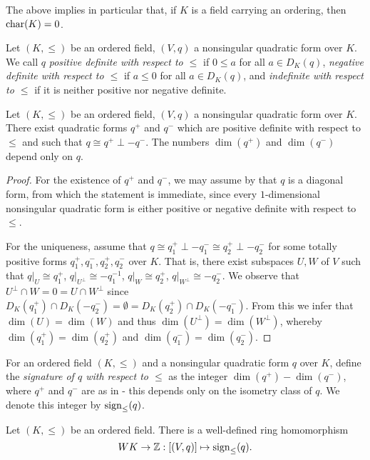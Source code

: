 \documentclass[12pt, leqno, british]{amsart}
\begin{document}
The above implies in particular that, if $K$ is a field carrying an ordering, then $\operatorname{char}(K) = 0$.
\begin{defi}
Let $(K, \leq)$ be an ordered field, $(V, q)$ a nonsingular quadratic form over $K$.
We call $q$ \emph{positive definite with respect to $\leq$} if $0 \leq a$ for all $a \in D_K(q)$, \emph{negative definite with respect to $\leq$} if $a \leq 0$ for all $a \in D_K(q)$, and \emph{indefinite with respect to $\leq$} if it is neither positive nor negative definite.
\end{defi}
\begin{thm}\label{T:Sylvester}
Let $(K, \leq)$ be an ordered field, $(V, q)$ a nonsingular quadratic form over $K$.
There exist quadratic forms $q^+$ and $q^-$ which are positive definite with respect to $\leq$ and such that $q \cong q^+ \perp -q^-$.
The numbers $\dim(q^+)$ and $\dim(q^-)$ depend only on $q$.
\end{thm}
\begin{proof}
For the existence of $q^+$ and $q^-$, we may assume by  that $q$ is a diagonal form, from which the statement is immediate, since every $1$-dimensional nonsingular quadratic form is either positive or negative definite with respect to $\leq$.

For the uniqueness, assume that $q \cong q^+_1 \perp -q^-_1 \cong q^+_2 \perp -q^-_2$ for some totally positive forms $q^+_1, q^-_1, q^+_2, q^-_2$ over $K$.
That is, there exist subspaces $U, W$ of $V$ such that $q\vert_U \cong q^+_1$, $q\vert_{U^\perp} \cong -q^{-1}_1$, $q\vert_W \cong q^+_2$, $q\vert_{W^\perp} \cong -q^-_2$.
We observe that $U^\perp \cap W = 0 = U \cap W^\perp$ since $D_{K}(q^+_1) \cap D_{K}(-q^-_2) = \emptyset = D_{K}(q^+_2) \cap D_{K}(-q^-_1)$.
From this we infer that $\dim(U) = \dim(W)$ and thus $\dim(U^\perp) = \dim(W^\perp)$, whereby $\dim(q^+_1) = \dim(q^+_2)$ and $\dim(q^-_1) = \dim(q^-_2)$.
\end{proof}
\begin{defi}
For an ordered field $(K, \leq)$ and a nonsingular quadratic form $q$ over $K$, define the \emph{signature of $q$ with respect to $\leq$} as the integer $\dim(q^+)-\dim(q^-)$, where $q^+$ and $q^-$ are as in  - this depends only on the isometry class of $q$.
We denote this integer by $\operatorname{sign}_\leq(q)$.
\end{defi}
\begin{prop}\label{P:signature-homomorphism}
Let $(K, \leq)$ be an ordered field.
There is a well-defined ring homomorphism
$$ WK \to \mathbb Z : [(V, q)] \mapsto \operatorname{sign}_\leq(q). $$
\end{prop}
\end{document}
